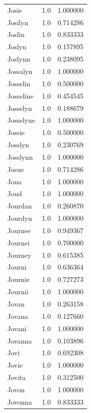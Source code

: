 \documentclass[
  letterpaper,
  DIV=11,
  numbers=noendperiod]{scrreprt}
\begin{document}
\begin{tabular}{lrr}
Josie           &   1.0 &   1.000000 \\
Josilyn         &   1.0 &   0.714286 \\
Joslin          &   1.0 &   0.833333 \\
Joslyn          &   1.0 &   0.157895 \\
Joslynn         &   1.0 &   0.238095 \\
Jossalyn        &   1.0 &   1.000000 \\
Josselin        &   1.0 &   0.500000 \\
Josseline       &   1.0 &   0.454545 \\
Josselyn        &   1.0 &   0.188679 \\
Josselyne       &   1.0 &   1.000000 \\
Jossie          &   1.0 &   0.500000 \\
Josslyn         &   1.0 &   0.230769 \\
Josslynn        &   1.0 &   1.000000 \\
Josue           &   1.0 &   0.714286 \\
Joua            &   1.0 &   1.000000 \\
Joud            &   1.0 &   1.000000 \\
Jourdan         &   1.0 &   0.260870 \\
Jourdyn         &   1.0 &   1.000000 \\
Journee         &   1.0 &   0.949367 \\
Journei         &   1.0 &   0.700000 \\
Journey         &   1.0 &   0.615385 \\
Journi          &   1.0 &   0.636364 \\
Journie         &   1.0 &   0.727273 \\
Journii         &   1.0 &   1.000000 \\
Jovan           &   1.0 &   0.263158 \\
Jovana          &   1.0 &   0.127660 \\
Jovani          &   1.0 &   1.000000 \\
Jovanna         &   1.0 &   0.103896 \\
Jovi            &   1.0 &   0.692308 \\
Jovie           &   1.0 &   1.000000 \\
Jovita          &   1.0 &   0.312500 \\
Jovon           &   1.0 &   1.000000 \\
Jovonna         &   1.0 &   0.833333 \\

\end{tabular}
\end{document}
